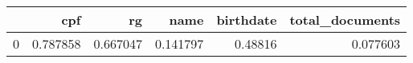 \begin{tabular}{lrrrrr}
\toprule
{} &       cpf &        rg &      name &  birthdate &  total\_documents \\
\midrule
0 &  0.787858 &  0.667047 &  0.141797 &    0.48816 &         0.077603 \\
\bottomrule
\end{tabular}
